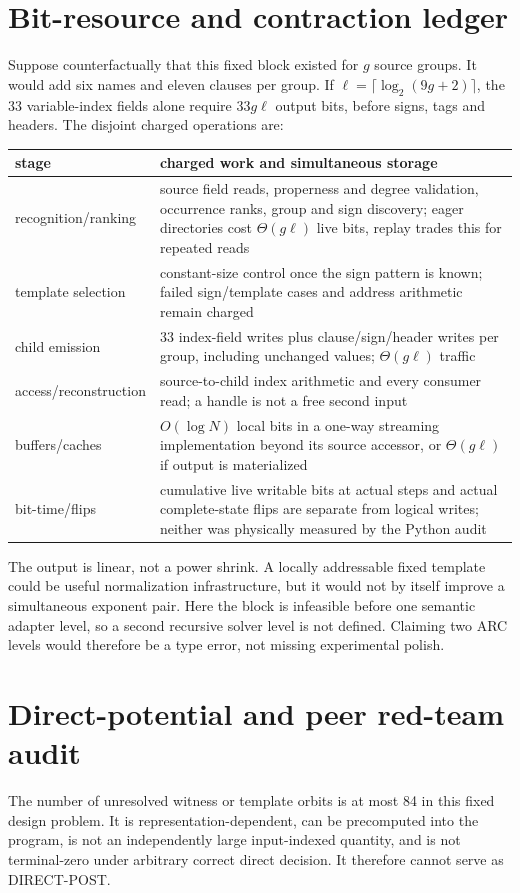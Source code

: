 \documentclass[11pt]{article}
\begin{document}
\section{Bit-resource and contraction ledger}
Suppose counterfactually that this fixed block existed for $g$ source groups.  It would add six names and eleven clauses per group.  If $\ell=\lceil\log_2(9g+2)\rceil$, the 33 variable-index fields alone require $33g\ell$ output bits, before signs, tags and headers.  The disjoint charged operations are:
\begin{longtable}{p{.32\linewidth}p{.60\linewidth}}
\toprule
stage & charged work and simultaneous storage\\\midrule
recognition/ranking & source field reads, properness and degree validation, occurrence ranks, group and sign discovery; eager directories cost $\Theta(g\ell)$ live bits, replay trades this for repeated reads\\
template selection & constant-size control once the sign pattern is known; failed sign/template cases and address arithmetic remain charged\\
child emission & 33 index-field writes plus clause/sign/header writes per group, including unchanged values; $\Theta(g\ell)$ traffic\\
access/reconstruction & source-to-child index arithmetic and every consumer read; a handle is not a free second input\\
buffers/caches & $O(\log N)$ local bits in a one-way streaming implementation beyond its source accessor, or $\Theta(g\ell)$ if output is materialized\\
bit-time/flips & cumulative live writable bits at actual steps and actual complete-state flips are separate from logical writes; neither was physically measured by the Python audit\\
\bottomrule
\end{longtable}
The output is linear, not a power shrink.  A locally addressable fixed template could be useful normalization infrastructure, but it would not by itself improve a simultaneous exponent pair.  Here the block is infeasible before one semantic adapter level, so a second recursive solver level is not defined.  Claiming two ARC levels would therefore be a type error, not missing experimental polish.

\section{Direct-potential and peer red-team audit}
The number of unresolved witness or template orbits is at most 84 in this fixed design problem.  It is representation-dependent, can be precomputed into the program, is not an independently large input-indexed quantity, and is not terminal-zero under arbitrary correct direct decision.  It therefore cannot serve as DIRECT-POST.
\end{document}
